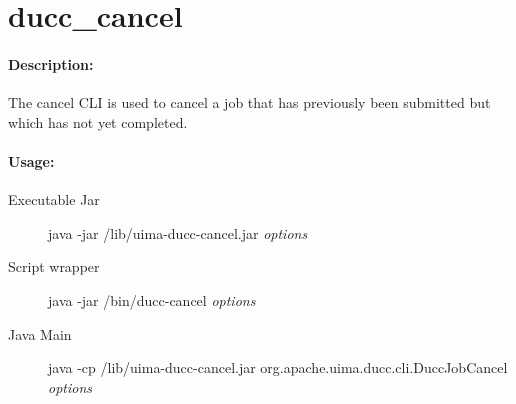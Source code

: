 \ifpdf
\else
{}
\fi
    \section{ducc\_cancel}
    \label{sec:cli.ducc-cancel}

    \paragraph{Description:}
    The cancel CLI is used to cancel a job that has previously been submitted but which has not yet 
    completed. 

    \paragraph{Usage:}
    \begin{description}
    \item[Executable Jar] java -jar \ducchome/lib/uima-ducc-cancel.jar {\em options}
    \item[Script wrapper] java -jar \ducchome/bin/ducc-cancel {\em options}
    \item[Java Main]      java -cp \ducchome/lib/uima-ducc-cancel.jar org.apache.uima.ducc.cli.DuccJobCancel {\em options}
    \end{description}

